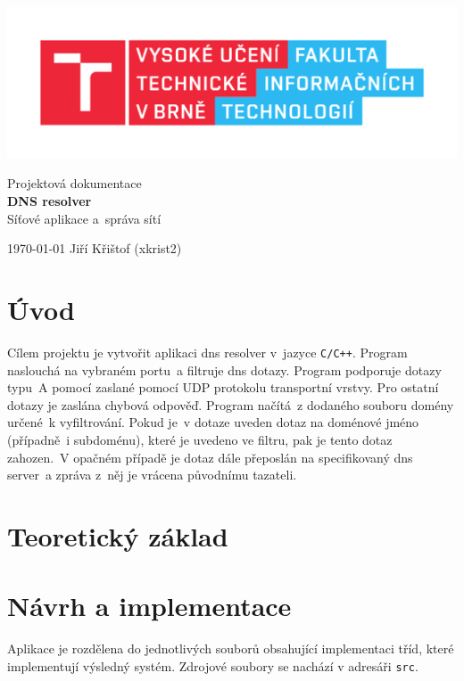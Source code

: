 \documentclass[a4paper, 11pt]{article}
\begin{document}
	\begin{titlepage}
		\begin{center}
			\includegraphics[width=0.77\linewidth]{FIT_logo.pdf} \\


			\Huge{Projektová dokumentace} \\
			\LARGE{\textbf{
				DNS resolver
			}} \\
			\Large{Síťové aplikace a~správa sítí}

		\end{center}

		{\Large
			\today
			\hfill
			Jiří Křištof (xkrist2)
		}
	\end{titlepage}
	\thispagestyle{empty}
	\tableofcontents
	\clearpage
	
	\setcounter{page}{1}

	\section{Úvod}
	Cílem projektu je vytvořit aplikaci dns resolver v~jazyce \texttt{C/C++}. Program naslouchá na vybraném portu~a filtruje dns dotazy. Program podporuje dotazy typu~A pomocí zaslané pomocí UDP protokolu transportní vrstvy. Pro ostatní dotazy je zaslána chybová odpověď. Program načítá~z dodaného souboru domény určené~k vyfiltrování. Pokud je~v dotaze uveden dotaz na doménové jméno (případně~i subdoménu), které je uvedeno ve filtru, pak je tento dotaz zahozen.~V opačném případě je dotaz dále přeposlán na specifikovaný dns server~a zpráva z~něj je vrácena původnímu tazateli.

	\section{Teoretický základ}
	

	\section{Návrh a implementace}
	Aplikace je rozdělena do jednotlivých souborů obsahující implementaci tříd, které implementují výsledný systém. Zdrojové soubory se nachází v adresáři \texttt{src}.
	
\end{document}
